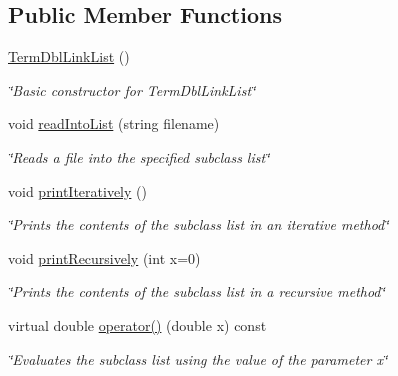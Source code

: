 \subsection*{Public Member Functions}
\begin{DoxyCompactItemize}
\item 
\hypertarget{classTermDblLinkList_af84103f1078cc4abee0635bdfcaf4749}{\hyperlink{classTermDblLinkList_af84103f1078cc4abee0635bdfcaf4749}{Term\-Dbl\-Link\-List} ()}\label{classTermDblLinkList_af84103f1078cc4abee0635bdfcaf4749}

\begin{DoxyCompactList}\small\item\em \char`\"{}\-Basic constructor for Term\-Dbl\-Link\-List\char`\"{} \end{DoxyCompactList}\item 
void \hyperlink{classTermDblLinkList_abc5166e40aaeb0988c905cd25e1ba167}{read\-Into\-List} (string filename)
\begin{DoxyCompactList}\small\item\em \char`\"{}\-Reads a file into the specified subclass list\char`\"{} \end{DoxyCompactList}\item 
\hypertarget{classTermDblLinkList_a6acc67af3d9536fd2c409e179bec05b3}{void \hyperlink{classTermDblLinkList_a6acc67af3d9536fd2c409e179bec05b3}{print\-Iteratively} ()}\label{classTermDblLinkList_a6acc67af3d9536fd2c409e179bec05b3}

\begin{DoxyCompactList}\small\item\em \char`\"{}\-Prints the contents of the subclass list in an iterative method\char`\"{} \end{DoxyCompactList}\item 
void \hyperlink{classTermDblLinkList_aa00c9ea87584a884888839ade9a1cfef}{print\-Recursively} (int x=0)
\begin{DoxyCompactList}\small\item\em \char`\"{}\-Prints the contents of the subclass list in a recursive method\char`\"{} \end{DoxyCompactList}\item 
virtual double \hyperlink{classTermDblLinkList_a0fb0c30585ad15c0059f3bcb44e2fab2}{operator()} (double x) const 
\begin{DoxyCompactList}\small\item\em \char`\"{}\-Evaluates the subclass list using the value of the parameter x\char`\"{} \end{DoxyCompactList}\end{DoxyCompactItemize}


